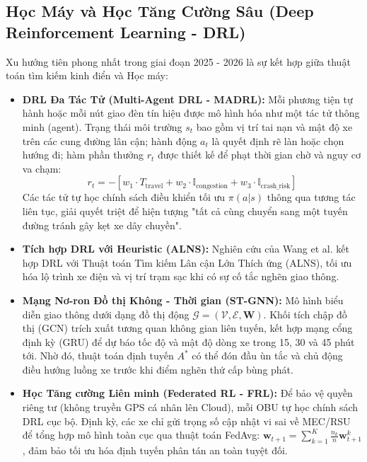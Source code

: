 \documentclass[a4paper]{article}
\begin{document}
\subsection{Học Máy và Học Tăng Cường Sâu (Deep Reinforcement Learning - DRL)}
Xu hướng tiên phong nhất trong giai đoạn 2025 - 2026 là sự kết hợp giữa thuật toán tìm kiếm kinh điển và Học máy:
\begin{itemize}
    \item \textbf{DRL Đa Tác Tử (Multi-Agent DRL - MADRL):} Mỗi phương tiện tự hành hoặc mỗi nút giao đèn tín hiệu được mô hình hóa như một tác tử thông minh (agent). Trạng thái môi trường $s_t$ bao gồm vị trí tai nạn và mật độ xe trên các cung đường lân cận; hành động $a_t$ là quyết định rẽ làn hoặc chọn hướng đi; hàm phần thưởng $r_t$ được thiết kế để phạt thời gian chờ và nguy cơ va chạm:
    \begin{equation}
        r_t = - \left[ w_1 \cdot T_{\text{travel}} + w_2 \cdot \mathbb{I}_{\text{congestion}} + w_3 \cdot \mathbb{I}_{\text{crash\_risk}} \right]
    \end{equation}
    Các tác tử tự học chính sách điều khiển tối ưu $\pi(a|s)$ thông qua tương tác liên tục, giải quyết triệt để hiện tượng "tất cả cùng chuyển sang một tuyến đường tránh gây kẹt xe dây chuyền".
    \item \textbf{Tích hợp DRL với Heuristic (ALNS):} Nghiên cứu của Wang et al. kết hợp DRL với Thuật toán Tìm kiếm Lân cận Lớn Thích ứng (ALNS), tối ưu hóa lộ trình xe điện và vị trí trạm sạc khi có sự cố tắc nghẽn giao thông.
    \item \textbf{Mạng Nơ-ron Đồ thị Không - Thời gian (ST-GNN):} Mô hình biểu diễn giao thông dưới dạng đồ thị động $\mathcal{G} = (\mathcal{V}, \mathcal{E}, \mathbf{W})$. Khối tích chập đồ thị (GCN) trích xuất tương quan không gian liên tuyến, kết hợp mạng cổng định kỳ (GRU) để dự báo tốc độ và mật độ dòng xe trong 15, 30 và 45 phút tới. Nhờ đó, thuật toán định tuyến $A^*$ có thể đón đầu ùn tắc và chủ động điều hướng luồng xe trước khi điểm nghẽn thứ cấp bùng phát.
    \item \textbf{Học Tăng cường Liên minh (Federated RL - FRL):} Để bảo vệ quyền riêng tư (không truyền GPS cá nhân lên Cloud), mỗi OBU tự học chính sách DRL cục bộ. Định kỳ, các xe chỉ gửi trọng số cập nhật vi sai về MEC/RSU để tổng hợp mô hình toàn cục qua thuật toán FedAvg: $\mathbf{w}_{t+1} = \sum_{k=1}^K \frac{n_k}{n} \mathbf{w}_{t+1}^k$, đảm bảo tối ưu hóa định tuyến phân tán an toàn tuyệt đối.
\end{itemize}
\end{document}
